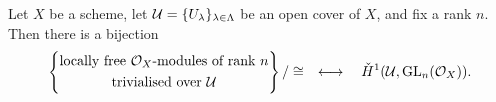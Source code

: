 \documentclass[12pt,a4paper]{article}
\begin{document}
\maketitle

\begin{theorem}
    Let $X$ be a scheme, let
    $\mathcal{U} = \{U_\lambda\}_{\lambda \in \Lambda}$ be an open cover
    of $X$, and fix a rank $n$. Then there is a bijection
    \begin{equation}
        \left\{
            \begin{gathered}
                \textnormal{locally free $\mathcal{O}_X$-modules of rank $n$}\\
                \textnormal{trivialised over $\mathcal{U}$}
            \end{gathered}
        \right\}/\cong
        \quad\longleftrightarrow\quad
        \check H^1(\mathcal{U},\operatorname{GL}_n(\mathcal{O}_X)).
    \end{equation}
\end{theorem}
\end{document}
